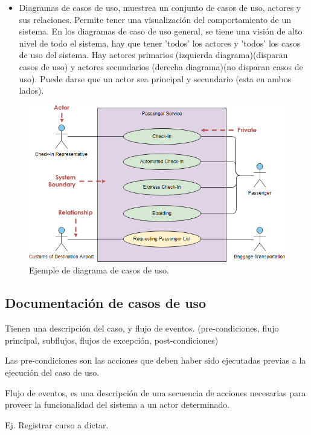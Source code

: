 \documentclass[titlepage,a4paper]{article}
\begin{document}
\begin{itemize}
    \item Diagramas de casos de uso, muestrea un conjunto de casos de uso, actores y sus relaciones. Permite tener una visualización del comportamiento de un sistema. En los diagramas de caso de uso general, se tiene una visión de alto nivel de todo el sistema, hay que tener 'todos' los actores y 'todos' los casos de uso del sistema. Hay actores primarios (izquierda diagrama)(disparan casos de uso) y actores secundarios (derecha diagrama)(no disparan casos de uso). Puede darse que un actor sea principal y secundario (esta en ambos lados).
\end{itemize}

\begin{figure}[!htb]
    \centering
    \includegraphics[width=0.9 \textwidth]{Imagenes/CasoDeUso.png}
    \caption{Ejemple de diagrama de casos de uso.}
\end{figure}


\subsection{Documentación de casos de uso}
Tienen una descripción del caso, y flujo de eventos. (pre-condiciones, flujo principal, subflujos, flujos de excepción, post-condiciones)

Las pre-condiciones son las acciones que deben haber sido ejecutadas previas a la ejecución del caso de uso. 

Flujo de eventos, es una descripción de una secuencia de acciones necesarias para proveer la funcionalidad del sistema a un actor determinado.

Ej. Registrar curso a dictar.
\end{document}

